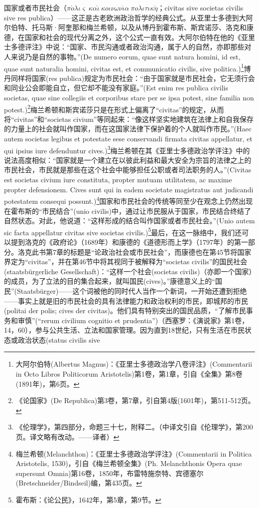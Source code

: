 国家或者市民社会（$\pi\acute{o}\lambda\iota\varsigma\ \kappa\alpha\grave{\iota}\ \kappa o\iota\nu\omega\nu\acute{\iota}\alpha\ \pi o\lambda\iota\tau\iota\kappa\acute{\eta}$；civitas sive societas civilis sive res publica）——这正是古老欧洲政治哲学的经典公式。从亚里士多德到大阿尔伯特、托马斯·阿奎那和梅兰希顿，以及从博丹到霍布斯、斯宾诺莎、洛克和康德，在国家和社会的现代分离之外，这个公式一直有效。大阿尔伯特在他的《亚里士多德评注》中说：“国家、市民沟通或者政治沟通，属于人的自然，亦即那些对人来说乃是自然的事物。”(De numero eorum, quae sunt natura homini, id est, quae sunt naturalia homini, civitas est, et communicatio civilis, sive politica.)\footnote{大阿尔伯特(Albertus Magnus)：《亚里士多德政治学八卷评注》(Commentarii in Octo Libros Politicorum Aristotelis)第1卷，第1章，引自《全集》第8卷(1891年)，第6页。}博丹同样将国家(res publica)规定为市民社会：“由于国家就是市民社会，它无须行会和同业公会即能自立，但它却不能没有家庭。”(Est enim res publica civilis societas, quae sine collegiis et corporibus stare per se ipsa potest, sine familia non potest.)\footnote{《论国家》(De Republica)第3卷，第7章，引自第4版(1601年)，第511-512页。}梅兰希顿和斯宾诺莎只是在形式上偏离了“civitas”的规定，从而将“civitas”和“societas civium”等同起来：“像这样坚实地建筑在法律上和自我保存的力量上的社会就叫作国家，而在这国家法律下保护着的个人就叫作市民。”(Haec autem societas legibus et potestate sese conservandi firmata civitas appellatur, et qui ipsius iure defenduntur cives.)\footnote{《伦理学》，第四部分，命题三十七，附释二。（中译文引自《伦理学》，第200页。译文略有改动。——译者）}梅兰希顿在其《亚里士多德政治学评注》中的说法高度相似：“国家就是一个建立在以彼此利益和最大安全为宗旨的法律之上的市民社会，市民就是那些在这个社会中能够担任公职或者司法职务的人。”(Civitas est societas civium iure constituta, propter mutuam utilitatem, ac maxime propter defensionem. Cives sunt qui in eadem societate magistratus aut judicandi potestatem consequi possunt.)\footnote{梅兰希顿(Melanchthon)：《亚里士多德政治学评注》(Commentarii in Politica Aristotelis, 1530)，引自《梅兰希顿全集》(Ph. Melanchthonis Opera quae supersunt Omnia)第16卷，1850年，布雷特施奈特、宾德塞尔(Bretschneider/Bindseil)编，第435页。}国家和市民社会的传统等同至少在观念上仍然出现在霍布斯的“市民结合”(unio civilis)中，通过让市民服从于国家，市民结合终结了自然状态。对此，他说道：“这样形成的结合叫作国家或者市民社会。”(Unio autem sic facta appellatur civitas sive societas civilis.)\footnote{霍布斯：《论公民》，1642年，第5章，第9节。}最后，在这一脉络中，我们还可以提到洛克的《政府论》（1689年）和康德的《道德形而上学》（1797年）的第一部分。洛克此书第7章的标题是“论政治社会或市民社会”，而康德也在第45节将国家界定为“civitas”，并在第46节中将其视同于被解释为“societas civilis”的国民社会(staatsbürgerliche Gesellschaft)：“这样一个社会(societas civilis)（亦即一个国家）的成员，为了立法的目的集合起来，就叫国民(cives)。”康德意义上的“国民”(Staatsbürger)——这个词被他的同时代人当作一个新词，一开始还遭到拒绝——事实上就是旧的市民社会的具有法律能力和政治权利的市民，即城邦的市民(politai der polis; cives der civitas)。他们具有特别突出的国民品质，“了解市民事务和审慎”(“rerum civilium cognitio et prudentia”)（西塞罗：《演说家》第1卷，14，60），参与公共生活、立法和国家管理。因为直到18世纪，只有生活在市民状态或政治状态(status civilis sive 